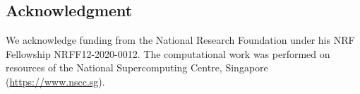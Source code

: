 \documentclass[a4paper,fleqn]{cas-dc}
\begin{document}





\subsection*{Acknowledgment}
\noindent We acknowledge funding
from the National Research Foundation under his NRF Fellowship
NRFF12-2020-0012. The
computational work was performed on resources of the National
Supercomputing Centre, Singapore (\url{https://www.nscc.sg}). 


\printcredits

%
% 
% 


%
%
\end{document}
